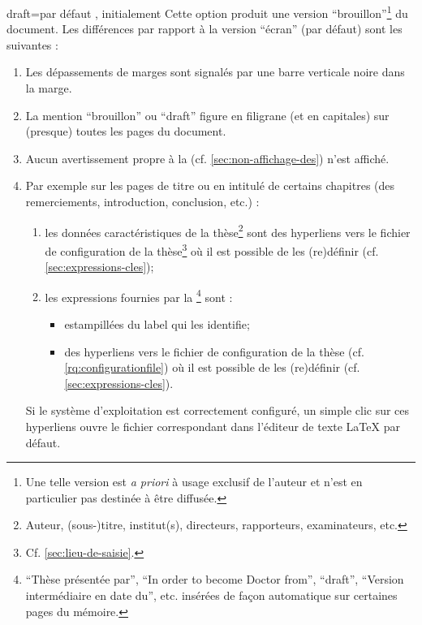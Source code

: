 \begin{docKey}{draft}{=\textbar{}}{par défaut ,
    initialement }
  Cette option produit une version \enquote{brouillon}\footnote{Une telle
    version est \emph{a priori} à usage exclusif de l'auteur et n'est en
    particulier pas destinée à être diffusée.} du document. Les différences par
  rapport à la version \enquote{écran} (par défaut) sont les suivantes :
  \begin{enumerate}
  \item Les dépassements de marges sont signalés par une barre
    verticale noire dans la marge.
  \item La mention \enquote{brouillon} ou
    \foreignquote{english}{draft}\selonlangue{} figure en filigrane (et en
    capitales) sur (presque) toutes les pages du document.
  \item Aucun avertissement propre à la \yatcl{}
    (cf. \vref{sec:non-affichage-des}) n'est affiché.
  \item Par exemple sur les pages de titre ou en intitulé de certains chapitres
    (des remerciements, introduction, conclusion, etc.) :
    \begin{enumerate}
    \item les données caractéristiques de la thèse\footnote{Auteur,
        (sous-)titre, institut(s), directeurs, rapporteurs,
        examinateurs, etc.} sont des hyperliens vers le fichier de
      configuration de la thèse\footnote{Cf. \vref{sec:lieu-de-saisie}.} où
      il est possible de les (re)définir (cf.
      \vref{sec:expressions-cles});
    \item\label{item-expression} les expressions fournies par
      la \yatcl\footnote{\enquote{Thèse présentée par},
        \foreignquote{english}{In order to become Doctor from},
        \foreignquote{english}{draft}, \enquote{Version
          intermédiaire en date du}, etc. insérées de façon
        automatique sur certaines pages du mémoire.} sont :
      \begin{itemize}
      \item estampillées du label qui les identifie;
      \item des hyperliens vers le fichier de configuration de la thèse (cf.
        \vref{rq:configurationfile}) où il est possible de les
        (re)définir (cf. \vref{sec:expressions-cles}).
    \end{itemize}
    \end{enumerate}
    Si le système d'exploitation est correctement configuré, un
    simple clic sur ces hyperliens ouvre le fichier correspondant
    dans l'éditeur de texte \LaTeX{} par défaut.
  \end{enumerate}
\end{docKey}


